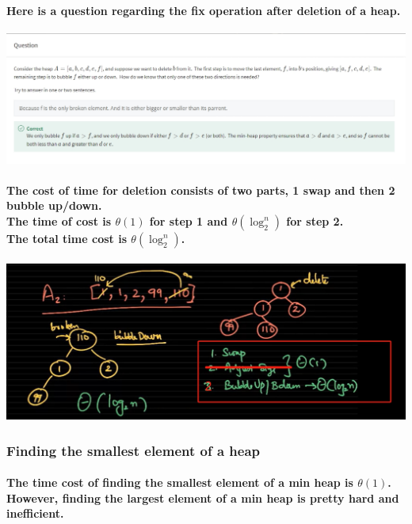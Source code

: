 \documentclass{article}
\begin{document}
\paragraph{Here is a question regarding the fix operation after deletion of a heap.\\}


\includegraphics[width=\textwidth]{questionofdeletion.png}



\paragraph{The cost of time for deletion consists of two parts, 1 swap and then 2 bubble up/down.\\
The time of cost is $\theta(1)$ for step 1 and $\theta(\log_2^n)$ for step 2.\\
The total time cost is $\theta(\log_2^n)$.\\}


\includegraphics[width=\textwidth]{deletiontimecost.png}



\subsubsection{Finding the smallest element of a heap}

\paragraph{The time cost of finding the smallest element of a min heap is $\theta(1)$.\\
However, finding the largest element of a min heap is pretty hard and inefficient.\\}
\end{document}
